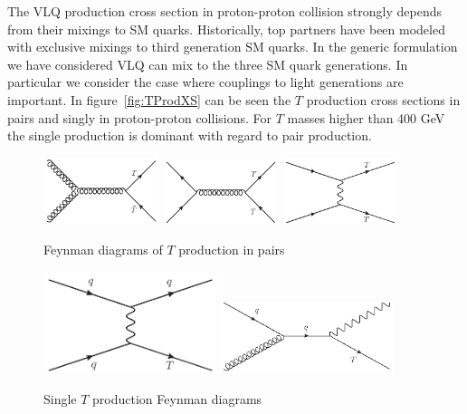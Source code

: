The VLQ production cross section in proton-proton collision strongly depends from their mixings to SM quarks. Historically, top partners have been modeled with exclusive mixings to third generation SM quarks. In the generic formulation we have considered VLQ can mix to the three SM quark generations. In particular we consider the case where couplings to light generations are important. In figure~\ref{fig:TProdXS} can be seen the $T$ production cross sections in pairs and singly in proton-proton collisions. For $T$ masses higher than 400 GeV the single production is dominant with regard to pair production. 

\begin{figure}[!Hhtbp]
  \begin{center}
    \includegraphics[width=0.3\textwidth]{figs/Gluon_fusion_T_pair.jpg}
    \includegraphics[width=0.3\textwidth]{figs/Quarks_schannel_T_pair.jpg}
    \includegraphics[width=0.3\textwidth]{figs/Gluon_tchannel_T_pair.jpg}
    \caption{Feynman diagrams of $T$ production in pairs}
    \label{fig:ProdDiagPair}
  \end{center}
\end{figure}

\begin{figure}[!Hhtbp]
  \begin{center}
    \includegraphics[width=0.45\textwidth]{figs/Tchannel_T_single.jpg}
    \includegraphics[width=0.45\textwidth]{figs/QuarkGluonFusion_SingleT.jpg}
    \caption{Single $T$ production Feynman diagrams}
    \label{fig:ProdDiagSingle}
  \end{center}
\end{figure}

